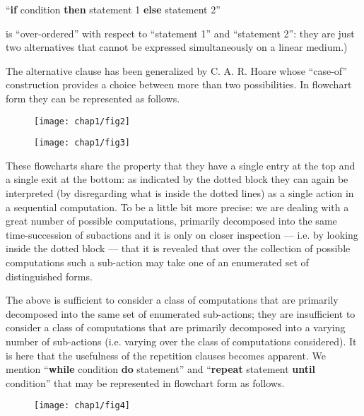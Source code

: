 {
	\setlength{\parindent}{8em}
	\hspace{-.4em}``\textbf{if} condition \textbf{then} statement 1 \textbf{else} statement 2''
}
\medskip

\noindent
is ``over-ordered'' with respect to ``statement 1'' and ``statement 2'': they are just two alternatives that cannot be expressed simultaneously on a linear medium.)

The alternative clause has been generalized by C. A. R. Hoare whose ``case-of'' construction provides a choice between more than two possibilities. In flowchart form they can be represented as follows.

\begin{figure}[ht!]
	\centering
	\texttt{[image: chap1/fig2]}
\end{figure}

\begin{figure}[ht!]
	\centering
	\texttt{[image: chap1/fig3]}
\end{figure}

These flowcharts share the property that they have a single entry at the top and a single exit at the bottom: as indicated by the dotted block they can again be interpreted (by disregarding what is inside the dotted lines) as a single action in a sequential computation. To be a little bit more precise: we are dealing with a great number of possible computations, primarily decomposed into the same time-succession of subactions and it is only on closer inspection --- i.e. by looking inside the dotted block --- that it is revealed that over the collection of possible computations such a sub-action may take one of an enumerated set of distinguished forms.

The above is sufficient to consider a class of computations that are primarily decomposed into the same set of enumerated sub-actions; they are insufficient to consider a class of computations that are primarily decomposed into a varying number of sub-actions (i.e. varying over the class of computations considered). It is here that the usefulness of the repetition clauses becomes apparent. We mention ``\textbf{while} condition \textbf{do} statement'' and ``\textbf{repeat} statement \textbf{until} condition'' that may be represented in flowchart form as follows.

\begin{figure}[ht!]
	\centering
	\texttt{[image: chap1/fig4]}
\end{figure}

